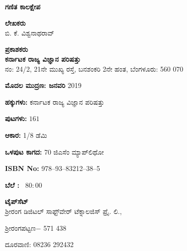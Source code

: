 ~
\thispagestyle{empty}

\vfill

\begin{center}
{\Large\bfseries ಗಣಿತ ಕಾಲಕ್ಷೇಪ}\\

\smallskip
\smallskip
\smallskip

{\bfseries ಲೇಖಕರು}\\[0.1cm]
ಬಿ. ಕೆ. ವಿಶ್ವನಾಥರಾವ್\\


\vfill

\smallskip

{\bfseries ಪ್ರಕಾಶಕರು}\\[0.1cm]
{\large\bfseries ಕರ್ನಾಟಕ ರಾಜ್ಯ ವಿಜ್ಞಾನ ಪರಿಷತ್ತು}\\
ನಂ: {\rm 24/2}, {\rm 21}ನೇ ಮುಖ್ಯ ರಸ್ತೆ, ಬನಶಂಕರಿ {\rm 2}ನೇ ಹಂತ, ಬೆಂಗಳೂರು: {\rm 560 070}
\end{center}

\vfill

\begin{center}
{\bfseries ಮೊದಲ ಮುದ್ರಣ: ಜನವರಿ} {\rm 2019}

\vfill

{\bfseries ಹಕ್ಕುಗಳು:} ಕರ್ನಾಟಕ ರಾಜ್ಯ ವಿಜ್ಞಾನ ಪರಿಷತ್ತು 

\vfill

{\bfseries ಪುಟಗಳು:} {\rm $161$}

\vfill

{\bfseries ಆಕಾರ:} {\rm 1/8} ಡೆಮಿ

\vfill

{\bfseries ಒಳಪುಟ ಕಾಗದ:} {\rm 70} ಜಿಎಸೆಂ ಮ್ಯಾಪ್‌ಲಿಥೋ 

\vfill

 {\rm {\bfseries ISBN No:}} {\rm 978$–$93$–$83212$–$38$–$5}

\vfill


{\bfseries ಬೆಲೆ :} \rupee \ {\rm $80:00$}

\vfill

{\bfseries ಟೈಪ್‌ಸೆಟ್}\\
 ಶ್ರೀರಂಗ ಡಿಜಿಟಲ್ ಸಾಫ್ಟ್‌ವೇರ್ ಟೆಕ್ನಾಲಜಿಸ್ ಪ್ರೈ. ಲಿ.,

ಶ್ರೀರಂಗಪಟ್ಟಣ$-$ {\rm 571 438}

\smallskip

ದೂರವಾಣಿ: {\rm 08236 292432}

\vfill

\end{center}
